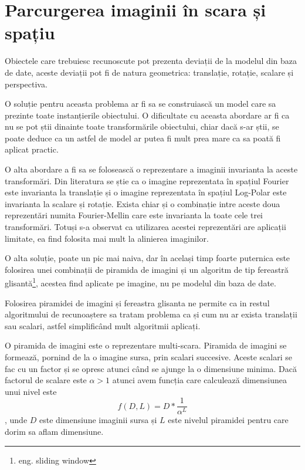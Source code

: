 \pagebreak
\section{Parcurgerea imaginii în scara și spațiu}

Obiectele care trebuiesc recunoscute pot prezenta deviații de la modelul din baza de date, aceste deviații pot fi de natura geometrica: translație, rotație, scalare și perspectiva.

O soluție pentru aceasta problema ar fi sa se construiască un model care sa prezinte toate instanțierile obiectului.
O dificultate cu aceasta abordare ar fi ca nu se pot știi dinainte toate transformările obiectului, chiar dacă s-ar știi, se poate deduce ca un astfel de model ar putea fi mult prea mare ca sa poată fi aplicat practic.

O alta abordare a fi sa se folosească o reprezentare a imaginii invarianta la aceste transformări.
Din literatura se știe ca o imagine reprezentata în spațiul Fourier este invarianta la translație și o imagine reprezentata în spațiul Log-Polar este invarianta la scalare și rotație.
Exista chiar și o combinație intre aceste doua reprezentări numita Fourier-Mellin care este invarianta la toate cele trei transformări.
Totuși s-a observat ca utilizarea acestei reprezentări are aplicații limitate, ea find folosita mai mult la alinierea imaginilor.

O alta soluție, poate un pic mai naiva, dar în același timp foarte puternica este folosirea unei combinații de piramida de imagini și un algoritm de tip fereastră glisantă\footnote{eng. sliding window}, acestea find aplicate pe imagine, nu pe modelul din baza de date.

Folosirea piramidei de imagini și fereastra glisanta ne permite ca in restul algoritmului de recunoaștere sa tratam problema ca și cum nu ar exista translații sau scalari, astfel simplificând mult algoritmii aplicați.

O piramida de imagini este o reprezentare multi-scara.
Piramida de imagini se formează, pornind de la o imagine sursa, prin scalari succesive.
Aceste scalari se fac cu un factor și se opresc atunci când se ajunge la o dimensiune minima.
Dacă factorul de scalare este ${\alpha > 1}$ atunci avem funcția care calculează dimensiunea unui nivel este  
$${ f(D,L) = D * \frac{1}{\alpha^L} }$$, unde ${D}$ este dimensiune imaginii sursa și ${L}$ este nivelul piramidei pentru care dorim sa aflam dimensiune.

